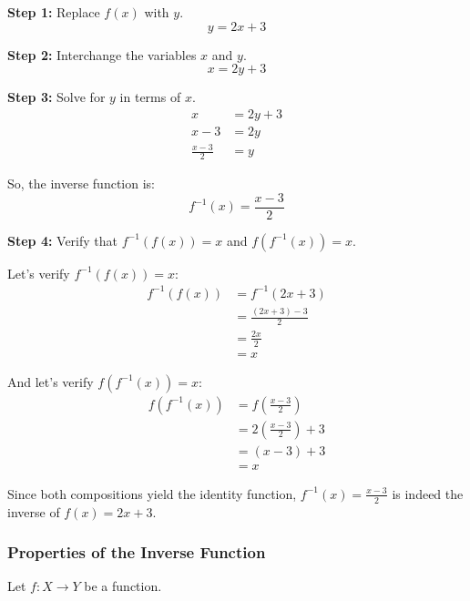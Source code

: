 \textbf{Step 1:} Replace \(f (x)\) with \(y\).
\[
	y = 2x + 3
\]

\textbf{Step 2:} Interchange the variables \(x\) and \(y\).
\[
	x = 2y + 3
\]

\textbf{Step 3:} Solve for \(y\) in terms of \(x\).
\begin{align*}
	x               & = 2y + 3 \\
	x - 3           & = 2y     \\
	\frac{x - 3}{2} & = y
\end{align*}

So, the inverse function is:
\[
	f^{-1}(x) = \frac{x - 3}{2}
\]

\textbf{Step 4:} Verify that \(f^{-1} (f (x)) = x\) and \(f(f^{-1} (x)) = x\).

Let's verify \(f^{-1} (f (x)) = x\):
\begin{align*}
	f^{-1}(f(x)) & = f^{-1}(2x + 3)         \\
	             & = \frac{(2x + 3) - 3}{2} \\
	             & = \frac{2x}{2}           \\
	             & = x
\end{align*}

And let's verify \(f(f^{-1}(x)) = x\):
\begin{align*}
	f(f^{-1}(x)) & = f\left(\frac{x - 3}{2}\right)     \\
	             & = 2\left(\frac{x - 3}{2}\right) + 3 \\
	             & = (x - 3) + 3                       \\
	             & = x
\end{align*}

Since both compositions yield the identity function, \(f^{-1} (x) = \frac{x - 3}{2}\) is indeed the inverse of \(f (x) = 2x + 3\).


\subsubsection{Properties of the Inverse Function}
Let \(f:X\to Y\) be a function.

